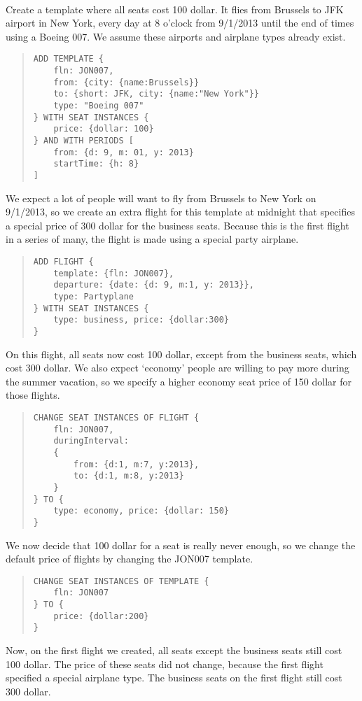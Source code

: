 \begin{texa}\label{ex:change_template}
  \\
  Create a template where all seats cost 100 dollar. It flies from Brussels to
  JFK airport in New York, every day at 8 o’clock from 9/1/2013 until the end of
  times using a Boeing 007. We assume these airports and airplane types already
  exist.
  \begin{quote}\begin{lstlisting}
ADD TEMPLATE {
    fln: JON007,
    from: {city: {name:Brussels}}
    to: {short: JFK, city: {name:"New York"}}
    type: "Boeing 007"
} WITH SEAT INSTANCES {
    price: {dollar: 100}
} AND WITH PERIODS [
    from: {d: 9, m: 01, y: 2013}
    startTime: {h: 8}
]
  \end{lstlisting}\end{quote}
  We expect a lot of people will want to fly from Brussels to New York on
  9/1/2013, so we create an extra flight for this template at midnight that
  specifies a special price of 300 dollar for the business seats. Because this
  is the first flight in a series of many, the flight is made using a special
  party airplane.
  \begin{quote}\begin{lstlisting}
ADD FLIGHT {
    template: {fln: JON007},
    departure: {date: {d: 9, m:1, y: 2013}},
    type: Partyplane
} WITH SEAT INSTANCES {
    type: business, price: {dollar:300}
}
  \end{lstlisting}\end{quote}
  On this flight, all seats now cost 100 dollar, except from the business seats,
  which cost 300 dollar.
  We also expect ‘economy’ people are willing to pay more during the summer
  vacation, so we specify a higher economy seat price of 150 dollar for those
  flights.
  \begin{quote}\begin{lstlisting}
CHANGE SEAT INSTANCES OF FLIGHT {
    fln: JON007,
    duringInterval:
    {
        from: {d:1, m:7, y:2013},
        to: {d:1, m:8, y:2013}
    }
} TO {
    type: economy, price: {dollar: 150}
}
  \end{lstlisting}\end{quote}
  We now decide that 100 dollar for a seat is really never enough, so we change
  the default price of flights by changing the JON007 template.
  \begin{quote}\begin{lstlisting}
CHANGE SEAT INSTANCES OF TEMPLATE {
    fln: JON007
} TO {
    price: {dollar:200}
}
  \end{lstlisting}\end{quote}
  Now, on the first flight we created, all seats except the business seats still
  cost 100 dollar. The price of these seats did not change, because the first
  flight specified a special airplane type. The business seats on the first
  flight still cost 300 dollar.
  

\end{texa}
